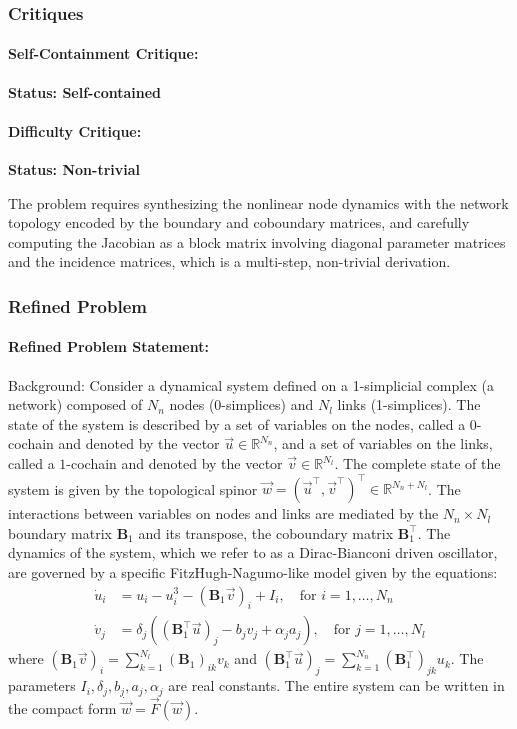 \documentclass[10pt]{article}
\begin{document}
\subsubsection*{Critiques}
\paragraph*{Self-Containment Critique:}
\textcolor{pass}{\textbf{Status: Self-contained}}




\paragraph*{Difficulty Critique:}
\textcolor{pass}{\textbf{Status: Non-trivial}}

The problem requires synthesizing the nonlinear node dynamics with the network topology encoded by the boundary and coboundary matrices, and carefully computing the Jacobian as a block matrix involving diagonal parameter matrices and the incidence matrices, which is a multi-step, non-trivial derivation.


\subsubsection*{Refined Problem}
\paragraph*{Refined Problem Statement:}
Background:
Consider a dynamical system defined on a 1-simplicial complex (a network) composed of $N_n$ nodes (0-simplices) and $N_l$ links (1-simplices). The state of the system is described by a set of variables on the nodes, called a $0$-cochain and denoted by the vector $\vec{u} \in \mathbb{R}^{N_n}$, and a set of variables on the links, called a $1$-cochain and denoted by the vector $\vec{v} \in \mathbb{R}^{N_l}$. The complete state of the system is given by the topological spinor $\vec{w} = (\vec{u}^\top, \vec{v}^\top)^\top \in \mathbb{R}^{N_n+N_l}$. The interactions between variables on nodes and links are mediated by the $N_n \times N_l$ boundary matrix $\boldsymbol{B}_1$ and its transpose, the coboundary matrix $\boldsymbol{B}_1^\top$. The dynamics of the system, which we refer to as a Dirac-Bianconi driven oscillator, are governed by a specific FitzHugh-Nagumo-like model given by the equations:
\begin{align*}
\dot{u}_i &= u_i - u_i^3 - (\boldsymbol{B}_1\vec{v})_i + I_i, \quad \text{for } i=1, \dots, N_n \\
\dot{v}_j &= \delta_j \left( (\boldsymbol{B}_1^\top\vec{u})_j - b_j v_j + \alpha_j a_j \right), \quad \text{for } j=1, \dots, N_l
\end{align*}
where $(\boldsymbol{B}_1\vec{v})_i = \sum_{k=1}^{N_l} (\boldsymbol{B}_1)_{ik} v_k$ and $(\boldsymbol{B}_1^\top\vec{u})_j = \sum_{k=1}^{N_n} (\boldsymbol{B}_1^\top)_{jk} u_k$. The parameters $I_i, \delta_j, b_j, a_j, \alpha_j$ are real constants. The entire system can be written in the compact form $\dot{\vec{w}} = \vec{F}(\vec{w})$.
\end{document}
